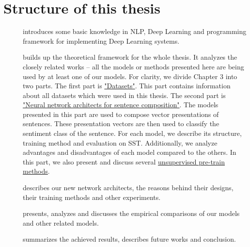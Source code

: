 \section{Structure of this thesis}
\begin{description}
\item [] introduces some basic knowledge in NLP, Deep Learning and programming framework for implementing Deep Learning systems. 
\item [] builds up the theoretical framework for the whole thesis. 
It analyzes the closely related works -- all the models or methods presented here are being used by at least one of our models.
For clarity, we divide Chapter 3 into two parts.
The first part is \hyperref[sec:dataset]{"Datasets"}. 
This part contains information about all datasets which were used in this thesis.
The second part is \hyperref[sec:composer]{"Neural network architects for sentence composition"}.
The models presented in this part are used to compose vector presentations of sentences.
These presentation vectors are then used to classify the sentiment class of the sentence.
For each model, we describe its structure, training method and evaluation on SST.
Additionally, we analyze advantages and disadvantages of each model compared to the others.
In this part, we also present and discuss several \hyperref[sec:unsupervised-pretrain]{unsupervised pre-train methods}.
\item [] describes our new network architects, the reasons behind their designs, their training methods and other experiments. 
\item [] presents, analyzes and discusses the empirical comparisons of our models and other related models.
\item [] summarizes the achieved results, describes future works and conclusion.
\end{description}